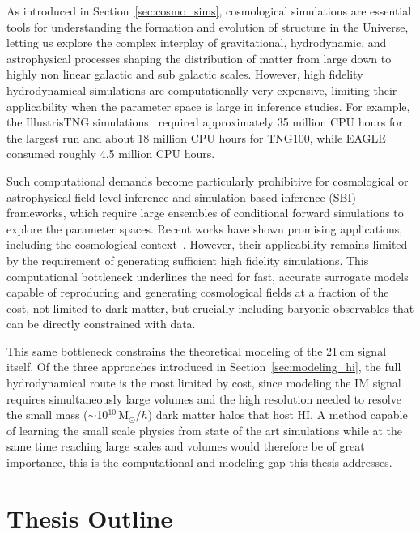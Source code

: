As introduced in Section~\ref{sec:cosmo_sims}, cosmological simulations are essential tools for understanding the formation and evolution of structure in the Universe, letting us explore the complex interplay of gravitational, hydrodynamic, and astrophysical processes shaping the distribution of matter from large down to highly non linear galactic and sub galactic scales. However, high fidelity hydrodynamical simulations are computationally very expensive, limiting their applicability when the parameter space is large in inference studies. For example, the IllustrisTNG simulations~\citep{nelson2021illustristngsimulationspublicdata,Pillepich_2017} required approximately 35 million CPU hours for the largest \TNG run and about 18 million CPU hours for TNG100, while EAGLE~\citep{EAGLE} consumed roughly 4.5 million CPU hours.

Such computational demands become particularly prohibitive for cosmological or astrophysical field level inference and simulation based inference (SBI) frameworks, which require large ensembles of conditional forward simulations to explore the parameter spaces. Recent works have shown promising applications, including the cosmological context~\citep{angulo_large-scale_2022,jeffrey_likelihood-free_2020,bairagi2025simulationsneedsimulationbasedinference,Zeghal_2025,karchev2023simsimssimulationbasedsupernovaia,Saxena_2024,tucci24}. However, their applicability remains limited by the requirement of generating sufficient high fidelity simulations. This computational bottleneck underlines the need for fast, accurate surrogate models capable of reproducing and generating cosmological fields at a fraction of the cost, not limited to dark matter, but crucially including baryonic observables that can be directly constrained with data.


This same bottleneck constrains the theoretical modeling of the 21\,cm signal itself. Of the three approaches introduced in Section~\ref{sec:modeling_hi}, the full hydrodynamical route is the most limited by cost, since modeling the IM signal requires simultaneously large volumes and the high resolution needed to resolve the small mass ($\sim$10$^{10}$\,M$_{\odot}/h$) dark matter halos that host HI. A method capable of learning the small scale physics from state of the art simulations while at the same time reaching large scales and volumes would therefore be of great importance, this is the computational and modeling gap this thesis addresses.


\section{Thesis Outline}

